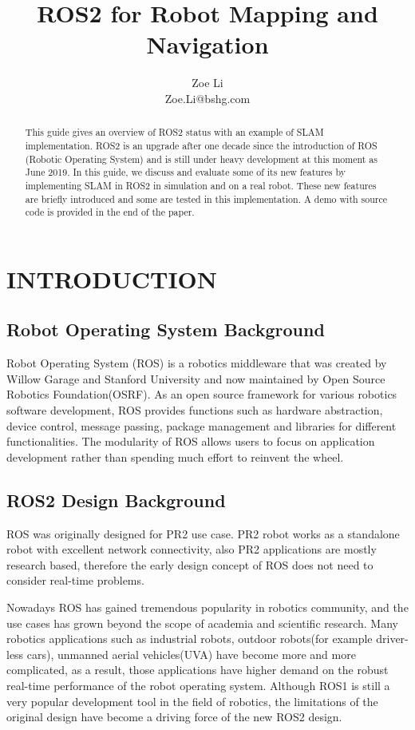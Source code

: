 \documentclass[letterpaper, 10 pt, conference]{ieeeconf}  %
\title{\LARGE \bf
ROS2 for Robot Mapping and Navigation
}
\author{Zoe Li \\
        Zoe.Li@bshg.com%
}
\begin{document}
\maketitle
\thispagestyle{empty}
\pagestyle{empty}
\begin{abstract}
 This guide gives an overview of ROS2 status with an example of SLAM implementation. ROS2 is an upgrade after one decade since the introduction of ROS (Robotic Operating System) and is still under heavy development at this moment as June 2019. In this guide, we discuss and evaluate some of its new features by implementing SLAM in ROS2 in simulation and on a real robot. These new features are briefly introduced and some are tested in this implementation. A demo with source code is provided in the end of the paper.
\end{abstract}
\section{INTRODUCTION}
\subsection{Robot Operating System Background}
Robot Operating System (ROS) is a robotics middleware that was created by Willow Garage and Stanford University and now maintained by Open Source Robotics Foundation(OSRF)\cite{c2}.  As an open source framework for various robotics software development, ROS provides functions such as hardware abstraction, device control, message passing, package management and libraries for different functionalities. The modularity of ROS allows users to focus on application development rather than spending much effort to reinvent the wheel.
\subsection{ROS2 Design Background}
ROS was originally designed for PR2 use case. PR2 robot works as a standalone robot with excellent network connectivity, also PR2 applications are mostly research based, therefore the early design concept of ROS does not need to consider real-time problems.

Nowadays ROS has gained tremendous popularity in robotics community, and the use cases has grown beyond the scope of academia and scientific research. Many robotics applications such as  industrial robots, outdoor robots(for example driver-less cars), unmanned aerial vehicles(UVA) have become more and more complicated, as a result, those applications have higher demand on the robust real-time performance of the robot operating system. Although ROS1 is still a very popular development tool in the field of robotics, the limitations of the original design have become a driving force of the new ROS2 design. 
\end{document}
